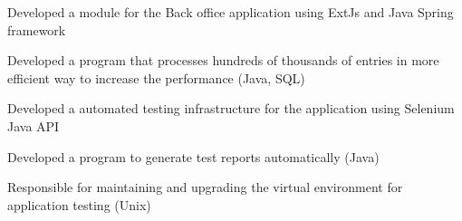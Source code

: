 \documentclass[]{main}
\begin{document}
\begin{minipage}[t]{0.73\textwidth}
\begin{tightemize}
\item Developed a module for the Back office application using ExtJs and Java Spring framework
\item Developed a program that processes hundreds of thousands of entries in more efficient way to increase the performance (Java, SQL)
\item Developed a automated testing infrastructure for the application using Selenium Java API
\item Developed a program to generate test reports automatically (Java)
\item Responsible for maintaining and upgrading the virtual environment for application testing (Unix)
\end{tightemize}
\sectionsep

\end{minipage} 

\newpage
\end{document}
